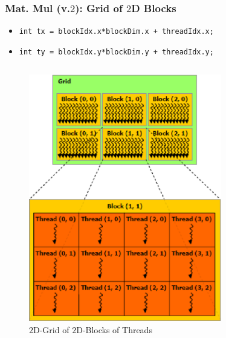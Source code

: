 %  
\begin{frame}
	\frametitle{Mat. Mul (v.$2$): Grid of $2$D Blocks}
      \begin{itemize}
	 \item \lstinline[style=MyCudaStyle]{int tx = blockIdx.x*blockDim.x + threadIdx.x;} 		      
	 \item \lstinline[style=MyCudaStyle]{int ty = blockIdx.y*blockDim.y + threadIdx.y;} 		      
      \end{itemize}		      
      \begin{columns}
           \begin{figure}[H]
              \centering
              \includegraphics[width=0.75\textwidth]{./img/BlockGrid.eps}
              \caption{\small{$2$D-Grid of $2$D-Blocks of Threads}}
           \end{figure}
     \end{columns}
\end{frame}

